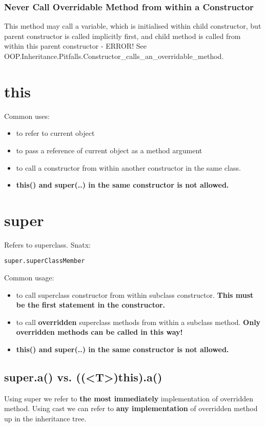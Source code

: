 \documentclass{report}
\begin{document}
\subsection{Never Call Overridable Method from within a Constructor}
This method may call a variable, which is initialised within child constructor, but parent constructor is called implicitly first, and child method is called from within this parent constructor - ERROR! See OOP.Inheritance.Pitfalls.Constructor\_calls\_an\_overridable\_method.



\chapter{this}
Common uses:
\begin{itemize}
	\item to refer to current object
	\item to pass a reference of current object as a method argument
	\item to call a constructor from within another constructor in the same class.
	\item \textbf{this() and super(..) in the same constructor is not allowed.}
\end{itemize}



\chapter{super}
Refers to superclass. Snatx:
\begin{verbatim}
super.superClassMember
\end{verbatim}
Common usage:
\begin{itemize}
	\item to call superclass constructor from within subclass constructor. \textbf{This must be the first statement in the constructor.}
	\item to call \textbf{overridden} superclass methods from within a subclass method. \textbf{Only overridden methods can be called in this way!}
	\item \textbf{this() and super(..) in the same constructor is not allowed.}
\end{itemize}


\section{super.a() vs. ((\textless T\textgreater)this).a()}
Using super we refer to \textbf{the most immediately} implementation of overridden method. Using cast we can refer to \textbf{any implementation }
of overridden method up in the inheritance tree.
\end{document}
